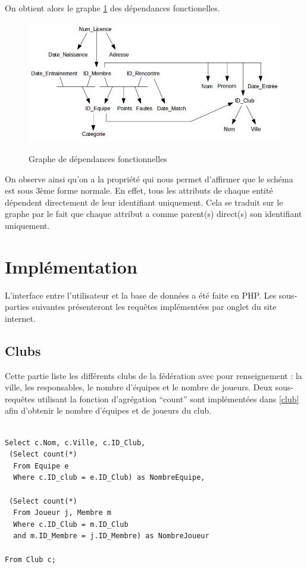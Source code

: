 \documentclass[a4paper»,8pt,french,fleqn]{report}
\begin{document}
On obtient alors le graphe \ref{fig:depfct} des dépendances fonctionelles.

\begin{figure}[h]
  \centering
    \includegraphics[scale=0.5]{DepFct.jpeg}
    \label{fig:depfct}
    \caption{Graphe de dépendances fonctionnelles}
\end{figure}

On observe ainsi qu'on a la propriété qui nous permet d'affirmer que le schéma est sous 3ème forme normale. En effet, tous les attributs de chaque entité dépendent directement de leur identifiant uniquement. Cela se traduit sur le graphe par le fait que chaque attribut a comme parent(s) direct(s) son identifiant uniquement.

\chapter{Implémentation}

L'interface entre l'utilisateur et la base de données a été faite en PHP. Les sous-parties suivantes présenteront les requêtes implémentées par onglet du site internet.

\section{Clubs}

Cette partie liste les différents clubs de la fédération avec pour renseignement : la ville, les responsables, le nombre d'équipes et le nombre de joueurs. Deux sous-requêtes utilisant la fonction d'agrégation ``count'' sont implémentées dans \ref{club} afin d'obtenir le nombre d'équipes et de joueurs du club. 

\begin{lstlisting}

Select c.Nom, c.Ville, c.ID_Club,
 (Select count(*) 
  From Equipe e
  Where c.ID_club = e.ID_Club) as NombreEquipe,

 (Select count(*) 
  From Joueur j, Membre m
  Where c.ID_Club = m.ID_Club
  and m.ID_Membre = j.ID_Membre) as NombreJoueur

From Club c;
\end{lstlisting}
\end{document}
